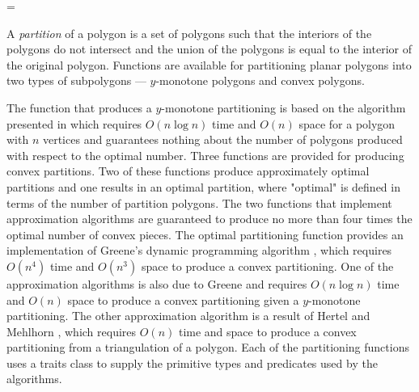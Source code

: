 


\ccEnableRawListOfRefpages


\begin{ccTexOnly}
\ifnum\ccNewRefManualStyle=\ccTrue
\end{ccTexOnly}
A {\em partition} of a polygon is a set 
of polygons such that the interiors of the polygons do not intersect and 
the union of the polygons is equal to the interior of the original polygon.
Functions are available for partitioning planar polygons into two 
types of subpolygons --- $y$-monotone polygons and convex polygons.  

The function that produces a $y$-monotone partitioning is based on the 
algorithm presented in \cite{bkos-cgaa-97} which requires $O(n \log n)$ time 
and $O(n)$ space for a polygon with $n$ vertices and guarantees nothing 
about the number of polygons produced with respect to the optimal number.
Three functions are provided for producing
convex partitions. Two of these functions produce approximately optimal 
partitions and one results in an optimal partition, where "optimal" is
defined in terms of the number of partition polygons.   The two functions
that implement approximation algorithms are guaranteed to produce no more 
than four times the optimal number of convex pieces.  The optimal partitioning
function provides an implementation of Greene's dynamic programming algorithm
\cite{g-dpcp-83}, which requires $O(n^4)$ time and $O(n^3)$ space to produce a 
convex partitioning. One of the approximation algorithms is also due to 
Greene \cite{g-dpcp-83} and requires $O(n \log n)$ time and $O(n)$ space
to produce a convex partitioning given a $y$-monotone partitioning.  The
other approximation algorithm is a result of Hertel and
Mehlhorn \cite{hm-ftsp-83}, which requires $O(n)$ time and space to produce
a convex partitioning from a triangulation of a polygon.
Each of the partitioning functions uses a traits class to supply the
primitive types and predicates used by the algorithms.
\begin{ccTexOnly}
\fi
\end{ccTexOnly}



